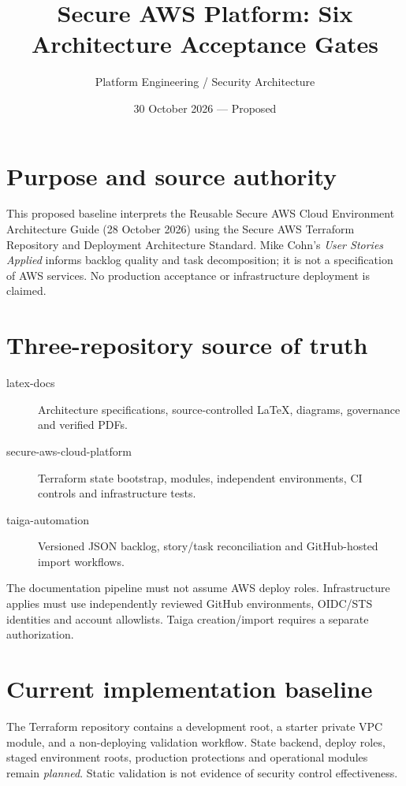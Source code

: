 \documentclass[11pt,letterpaper]{article}
\title{Secure AWS Platform: Six Architecture Acceptance Gates}
\author{Platform Engineering / Security Architecture}
\date{30 October 2026 --- Proposed}
\begin{document}
\maketitle
\tableofcontents

\section{Purpose and source authority}
This proposed baseline interprets the Reusable Secure AWS Cloud Environment Architecture Guide (28 October 2026) using the Secure AWS Terraform Repository and Deployment Architecture Standard. Mike Cohn's \emph{User Stories Applied} informs backlog quality and task decomposition; it is not a specification of AWS services. No production acceptance or infrastructure deployment is claimed.

\section{Three-repository source of truth}
\begin{description}
\item[latex-docs] Architecture specifications, source-controlled \LaTeX{}, diagrams, governance and verified PDFs.
\item[secure-aws-cloud-platform] Terraform state bootstrap, modules, independent environments, CI controls and infrastructure tests.
\item[taiga-automation] Versioned JSON backlog, story/task reconciliation and GitHub-hosted import workflows.
\end{description}
The documentation pipeline must not assume AWS deploy roles. Infrastructure applies must use independently reviewed GitHub environments, OIDC/STS identities and account allowlists. Taiga creation/import requires a separate authorization.

\section{Current implementation baseline}
The Terraform repository contains a development root, a starter private VPC module, and a non-deploying validation workflow. State backend, deploy roles, staged environment roots, production protections and operational modules remain \emph{planned}. Static validation is not evidence of security control effectiveness.
\end{document}
